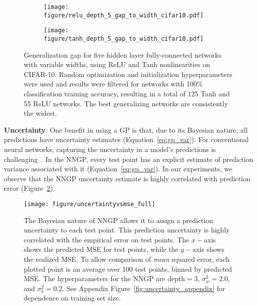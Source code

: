 \documentclass{article} %
\begin{document}
\begin{figure}[ht]
\centering
  \begin{subfigure}[b]{0.4\textwidth}
  \texttt{[image: figure/relu\_depth\_5\_gap\_to\_width\_cifar10.pdf]}
  \end{subfigure}
  \begin{subfigure}[b]{0.4\textwidth}
  \texttt{[image: figure/tanh\_depth\_5\_gap\_to\_width\_cifar10.pdf]}
  \end{subfigure}
  \caption{Generalization gap for five hidden layer fully-connected networks with variable widths, using ReLU and Tanh nonlinearities on CIFAR-10. Random optimization and initialization hyperparameters were used and results were filtered for networks with 100\% classification training accuracy, resulting in a total of 125 Tanh and 55 ReLU networks. The best generalizing networks are consistently the widest.}
  \label{fig:gen_width}
\end{figure}



{\bf Uncertainty}: One benefit in using a GP is that, due to its Bayesian nature, all predictions have uncertainty estimates (Equation~\ref{eq:gp_var}). For conventional neural networks, capturing the uncertainty in a model's predictions is challenging~\citep{gal2016uncertainty}. 
In the NNGP, every test point has an explicit estimate of prediction variance associated with it (Equation~\ref{eq:gp_var}). 
In our experiments, we observe that the NNGP uncertainty estimate is highly correlated with prediction error (Figure~\ref{fig:uncertainty}).




\begin{figure}[ht]
  \centering
  \texttt{[image: figure/uncertaintyvsmse\_full]}
  \caption{The Bayesian nature of NNGP allows it to assign a prediction uncertainty to each test point. 
  This prediction uncertainty is highly correlated with the empirical error on test points. The $x-$axis shows the predicted MSE for test points, while the $y-$axis shows the realized MSE. 
  To allow comparison of {\em mean} squared error, each plotted point is an average over 100 test points, binned by predicted MSE. 
  The hyperparameters for the NNGP are depth$=3$, $\sigma_w^2=2.0$, and $\sigma_b^2=0.2$. See Appendix Figure~\ref{fig:uncertainty_appendix} for dependence on training set size.}
  \label{fig:uncertainty}
\end{figure}
\end{document}

